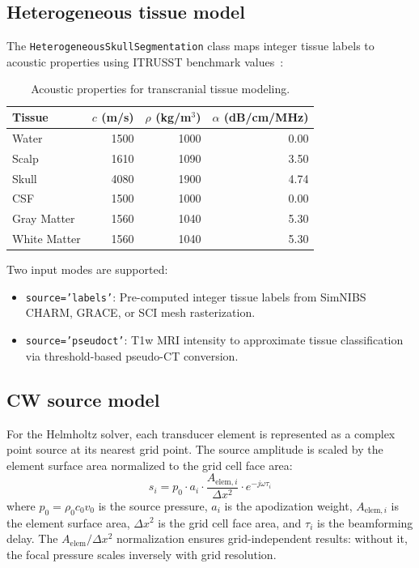\documentclass[11pt,a4paper]{article}\usepackage[]{graphicx}\usepackage[]{xcolor}
\begin{document}
\subsection{Heterogeneous tissue model}

The \texttt{HeterogeneousSkullSegmentation} class maps integer tissue
labels to acoustic properties using ITRUSST benchmark
values~\citep{Aubry2022benchmarks}:

\begin{table}

\caption{\label{tab:tissue_table}Acoustic properties for transcranial tissue modeling.}
\centering
\begin{tabular}[t]{lrrr}
\toprule
Tissue & $c$ (m/s) & $\rho$ (kg/m$^3$) & $\alpha$ (dB/cm/MHz)\\
\midrule
Water & 1500 & 1000 & 0.00\\
Scalp & 1610 & 1090 & 3.50\\
Skull & 4080 & 1900 & 4.74\\
CSF & 1500 & 1000 & 0.00\\
Gray Matter & 1560 & 1040 & 5.30\\
\addlinespace
White Matter & 1560 & 1040 & 5.30\\
\bottomrule
\end{tabular}
\end{table}



Two input modes are supported:
\begin{itemize}
  \item \texttt{source='labels'}: Pre-computed integer tissue labels from
    SimNIBS CHARM, GRACE, or SCI mesh rasterization.
  \item \texttt{source='pseudoct'}: T1w MRI intensity to approximate
    tissue classification via threshold-based pseudo-CT conversion.
\end{itemize}

\subsection{CW source model}

For the Helmholtz solver, each transducer element is represented as a
complex point source at its nearest grid point. The source amplitude is
scaled by the element surface area normalized to the grid cell face area:
%
\begin{equation}
  s_i = p_0 \cdot a_i \cdot \frac{A_{\text{elem},i}}{\Delta x^2}
    \cdot e^{-j\omega \tau_i}
  \label{eq:source}
\end{equation}
%
where $p_0 = \rho_0 c_0 v_0$ is the source pressure, $a_i$ is the
apodization weight, $A_{\text{elem},i}$ is the element surface area,
$\Delta x^2$ is the grid cell face area, and $\tau_i$ is the
beamforming delay. The $A_{\text{elem}} / \Delta x^2$ normalization
ensures grid-independent results: without it, the focal pressure scales
inversely with grid resolution.
\end{document}
